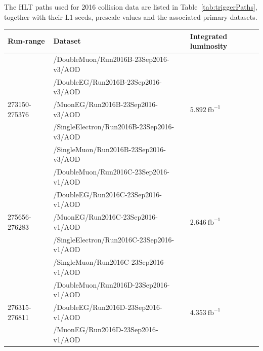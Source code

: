 The HLT paths used for 2016 collision data are listed in Table~\ref{tab:triggerPaths}, 
together with their L1 seeds, prescale values and the associated primary datasets.


\begin{table}[h]
\tiny
    \centering
    \begin{tabular}{|l|l|l|} 
\hline %
\hline %
Run-range & Dataset & Integrated luminosity \\
\hline %
\hline %
\multirow{5}{*}{273150-275376} & /DoubleMuon/Run2016B-23Sep2016-v3/AOD &  \multirow{5}{*}{$5.892\ \text{fb}^{-1}$} \\ 
& /DoubleEG/Run2016B-23Sep2016-v3/AOD &  \\ 
& /MuonEG/Run2016B-23Sep2016-v3/AOD &  \\ 
& /SingleElectron/Run2016B-23Sep2016-v3/AOD &  \\ 
& /SingleMuon/Run2016B-23Sep2016-v3/AOD &  \\ 
\hline
\multirow{5}{*}{275656-276283} & /DoubleMuon/Run2016C-23Sep2016-v1/AOD &  \multirow{5}{*}{$2.646\ \text{fb}^{-1}$}  \\ 
& /DoubleEG/Run2016C-23Sep2016-v1/AOD &  \\ 
& /MuonEG/Run2016C-23Sep2016-v1/AOD &  \\ 
& /SingleElectron/Run2016C-23Sep2016-v1/AOD &  \\ 
& /SingleMuon/Run2016C-23Sep2016-v1/AOD &  \\ 
\hline
\multirow{5}{*}{276315-276811} & /DoubleMuon/Run2016D-23Sep2016-v1/AOD &  \multirow{5}{*}{$4.353\ \text{fb}^{-1}$} \\ 
& /DoubleEG/Run2016D-23Sep2016-v1/AOD &  \\ 
& /MuonEG/Run2016D-23Sep2016-v1/AOD &  \\ 

\end{tabular}
\end{table}
